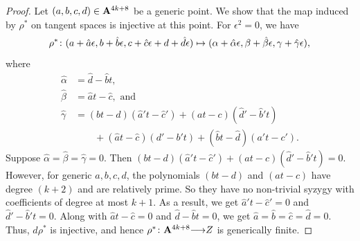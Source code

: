 \documentclass[11pt,reqno]{amsart}
\theoremstyle{plain}
\theoremstyle{definition}
\theoremstyle{remark}
\numberwithin{equation}{section}
\renewcommand{\to}{{\longrightarrow}}
\numberwithin{equation}{section}
\begin{document}
\begin{proof}
  Let $(a,b,c,d) \in {\bf A}^{4k+8}$ be a generic point.
  We show that the map induced by $\rho^*$ on tangent spaces is injective at this point.
  For $\epsilon^2 = 0$, we have
  \[
    \rho^* {\colon} (a + \hat a \epsilon, b+ {\hat b} \epsilon, c +  {\hat c} \epsilon + d +  {\hat d}\epsilon) \mapsto (\alpha + \hat{\alpha} \epsilon,\beta + \hat{\beta} \epsilon, \gamma + \hat{\gamma}\epsilon),
  \]
  where
  \begin{align*}
    \hat \alpha &= \hat d - \hat b t,\\
    \hat \beta &=  \hat a t - \hat c, \text{ and }\\
    \hat \gamma & = (bt-d)({\hat a}'t-{\hat c}') + (at-c)({\hat d}'-{\hat b}'t) \\
    & \qquad + ({\hat a}t-{\hat c})(d'-b't) + ({\hat b}t-{\hat d})(a't-c').
  \end{align*}
  Suppose $\hat \alpha = \hat \beta = \hat \gamma = 0$.
  Then $(bt-d)(\hat a' t - \hat c') + (at-c) (\hat d' - \hat b' t) = 0$.
  However, for generic $a, b, c, d$, the polynomials $(bt-d)$ and $(at-c)$ have degree $(k+2)$ and are relatively prime.
  So they have no non-trivial syzygy with coefficients of degree at most $k+1$.
  As a result, we get $\hat a' t - \hat c' = 0$ and $\hat d' - \hat b' t = 0$.
  Along with $\hat a t - \hat c = 0$ and $\hat d - \hat b t = 0$, we get $\hat a = \hat b = \hat c = \hat d = 0$.
  Thus, $d \rho^*$ is injective, and hence $\rho^* \from \A^{4k+8} \to Z$ is generically finite.




\end{proof}
\end{document}
